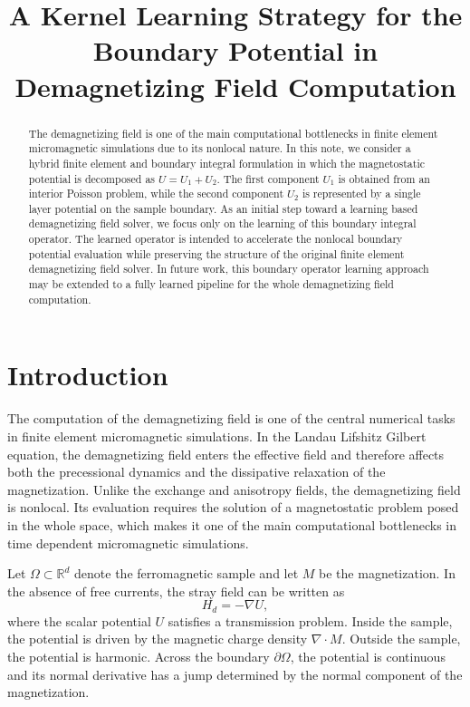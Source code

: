 \documentclass[11pt]{article}
\title{A Kernel Learning Strategy for the Boundary Potential in Demagnetizing Field Computation}
\author{}
\date{}
\numberwithin{equation}{section}
\begin{document}
\maketitle

\begin{abstract}
The demagnetizing field is one of the main computational bottlenecks in finite element micromagnetic simulations due to its nonlocal nature. In this note, we consider a hybrid finite element and boundary integral formulation in which the magnetostatic potential is decomposed as \(U=U_1+U_2\). The first component \(U_1\) is obtained from an interior Poisson problem, while the second component \(U_2\) is represented by a single layer potential on the sample boundary. As an initial step toward a learning based demagnetizing field solver, we focus only on the learning of this boundary integral operator. The learned operator is intended to accelerate the nonlocal boundary potential evaluation while preserving the structure of the original finite element demagnetizing field solver. In future work, this boundary operator learning approach may be extended to a fully learned pipeline for the whole demagnetizing field computation.
\end{abstract}

\section{Introduction}

The computation of the demagnetizing field is one of the central numerical tasks in finite element micromagnetic simulations. In the Landau Lifshitz Gilbert equation, the demagnetizing field enters the effective field and therefore affects both the precessional dynamics and the dissipative relaxation of the magnetization. Unlike the exchange and anisotropy fields, the demagnetizing field is nonlocal. Its evaluation requires the solution of a magnetostatic problem posed in the whole space, which makes it one of the main computational bottlenecks in time dependent micromagnetic simulations.

Let \(\Omega \subset \mathbb{R}^d\) denote the ferromagnetic sample and let \(M\) be the magnetization. In the absence of free currents, the stray field can be written as
\begin{equation}
    H_d = -\nabla U,
\end{equation}
where the scalar potential \(U\) satisfies a transmission problem. Inside the sample, the potential is driven by the magnetic charge density \(\nabla \cdot M\). Outside the sample, the potential is harmonic. Across the boundary \(\partial\Omega\), the potential is continuous and its normal derivative has a jump determined by the normal component of the magnetization.
\end{document}
